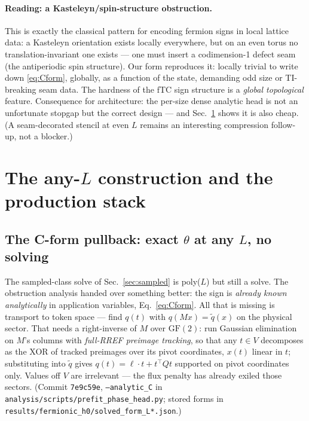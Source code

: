 \documentclass[11pt]{article}
\newcommand{\GF}{\mathrm{GF}(2)}
\newcommand{\file}[1]{\texttt{#1}}
\begin{document}
\paragraph{Reading: a Kasteleyn/spin-structure obstruction.}
This is exactly the classical pattern for encoding fermion signs in local
lattice data: a Kasteleyn orientation exists locally everywhere, but on an
even torus no translation-invariant one exists --- one must insert a
codimension-1 defect seam (the antiperiodic spin structure). Our form
reproduces it: locally trivial to write down \eqref{eq:Cform}, globally, as a
function of the state, demanding odd size or TI-breaking seam data. The
hardness of the fTC sign structure is a \emph{global topological} feature.
Consequence for architecture: the per-size dense analytic head is not an
unfortunate stopgap but the correct design --- and Sec.~\ref{sec:anyL} shows
it is also cheap. (A seam-decorated stencil at even $L$ remains an
interesting compression follow-up, not a blocker.)

\section{The any-$L$ construction and the production stack}
\label{sec:anyL}

\subsection{The C-form pullback: exact $\theta$ at any $L$, no solving}
\label{sec:pullback}

The sampled-class solve of Sec.~\ref{sec:sampled} is poly($L$) but still a
solve. The obstruction analysis handed over something better: the sign is
\emph{already known analytically} in application variables, Eq.~\eqref{eq:Cform}.
All that is missing is transport to token space --- find $q(t)$ with
$q(Mx)=\tilde q(x)$ on the physical sector. That needs a right-inverse of
$M$ over $\GF$: run Gaussian elimination on $M$'s columns with \emph{full-RREF
preimage tracking}, so that any $t\in V$ decomposes as the XOR of tracked
preimages over its pivot coordinates, $x(t)$ linear in $t$; substituting into
$\tilde q$ gives $q(t)=\ell\cdot t + t^{\!\top}Qt$ supported on pivot
coordinates only. Values off $V$ are irrelevant --- the flux penalty has
already exiled those sectors. (Commit \texttt{7e9c59e},
\texttt{--analytic\_C} in \file{analysis/scripts/prefit\_phase\_head.py}; stored
forms in \file{results/fermionic\_h0/solved\_form\_L*.json}.)
\end{document}
